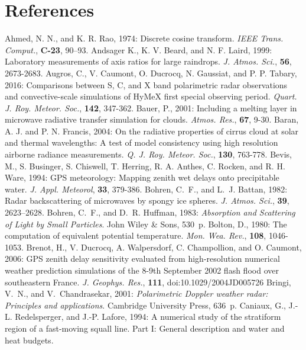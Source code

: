 \section{References}
\decrefname
Ahmed, N. N., and K. R. Rao, 1974: Discrete cosine transform. {\em IEEE Trans.
  Comput.}, {\bf C-23}, 90--93.
\decrefname
Andsager K., K. V. Beard, and N. F. Laird, 1999: 
      Laboratory measurements of axis ratios for large raindrops.
      {\it J. Atmos. Sci.},
      {\bf 56},
      2673-2683.
\decrefname
Augros, C., V. Caumont, O. Ducrocq, N. Gaussiat, and P. P. Tabary, 2016:
      Comparisons between S, C, and X band polarimetric radar observations
      and convective-scale simulations of HyMeX first special observing period.
      {\it Quart. J. Roy. Meteor. Soc.}, {\bf 142}, 347-362.
\decrefname
Bauer, P., 2001: Including a melting layer in microwave radiative transfer
       simulation for clouds. {\it Atmos. Res.}, {\bf 67}, 9-30.
\decrefname
Baran, A. J. and P. N. Francis, 2004:
      On the radiative properties of cirrus cloud at solar and thermal
      wavelengths: A test of model consistency using high resolution
      airborne radiance measurements.
      {\it Q. J. Roy. Meteor. Soc.}, {\bf 130}, 763-778.
\decrefname
Bevis, M., S. Businger, S. Chiswell, T. Herring, R. A. Anthes, C. Rocken, and R. H. Ware, 1994:
      GPS meteorology: Mapping zenith wet delays onto precipitable water.
      {\it J. Appl. Meteorol}, {\bf 33}, 379-386.
\decrefname
Bohren, C.~F., and L.~J. Battan, 1982: Radar backscattering of microwaves by
  spongy ice spheres. {\em J. Atmos. Sci.}, {\bf 39}, 2623--2628.
\decrefname
Bohren, C.~F., and D.~R. Huffman, 1983: {\em Absorption and Scattering of Light by
  Small Particles}. John Wiley \& Sons, 530~p.
\decrefname
Bolton, D., 1980: The computation of equivalent potential temperature.
      {\it Mon. Wea. Rev.}, 
      {\bf 108},
      1046-1053.
\decrefname
Brenot, H., V. Ducrocq, A. Walpersdorf, C. Champollion, and O. Caumont, 2006:
GPS zenith delay sensitivity evaluated from high-resolution numerical weather prediction
simulations of the 8-9th September 2002 flash flood over southeastern France.
      {\it J. Geophys. Res.},
      {\bf 111},
      doi:10.1029/2004JD005726
\decrefname
Bringi, V.~N., and V.~Chandrasekar, 2001: {\em Polarimetric {Doppler} weather
  radar\string: {Principles} and applications}. Cambridge University Press,
  636~p.
\decrefname
Caniaux, G., J.-L. Redelsperger, and J.-P. Lafore, 1994:
      A numerical study of the stratiform region of a fast-moving squall line.
      Part I: General description and water and heat budgets.
